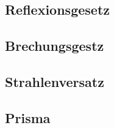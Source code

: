 \subsection{Reflexionsgesetz}
\label{sec:reflexionsmessung}
\subsection{Brechungsgestz}
\label{sec:brechungmessung}
\subsection{Strahlenversatz}
\label{sec:strahlenversatzmessung}
\subsection{Prisma}
\label{sec:prismamessung}
